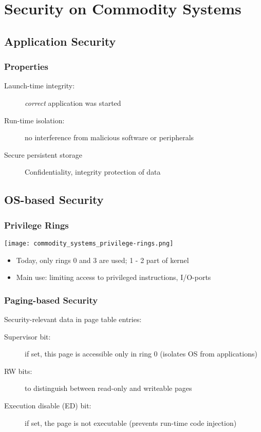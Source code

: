 
\section{Security on Commodity Systems}
\subsection{Application Security}
\subsubsection{Properties}
\begin{description}
  \item[Launch-time integrity:] \textit{correct} application was started
  \item[Run-time isolation:] no interference from malicious software or
    peripherals
  \item[Secure persistent storage] Confidentiality, integrity protection of
    data
\end{description}


\subsection{OS-based Security}
\subsubsection{Privilege Rings}
\begin{center}
  \texttt{[image: commodity\_systems\_privilege-rings.png]}
\end{center}
\begin{itemize}
  \item Today, only rings 0 and 3 are used; 1 - 2 part of kernel
  \item Main use: limiting access to privileged instructions, I/O-ports
\end{itemize}


\subsubsection{Paging-based Security}
Security-relevant data in page table entries:
\begin{description}
  \item[Supervisor bit:] if set, this page is accessible only in ring 0
    (isolates OS from applications)
  \item[RW bits:] to distinguish between read-only and writeable pages
  \item[Execution disable (ED) bit:] if set, the page is not executable
    (prevents run-time code injection)
\end{description}


